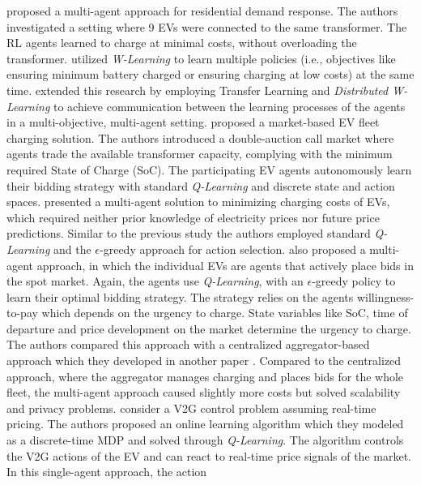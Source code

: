 \documentclass[12pt, article]{article}
\begin{document}
\textcite{dusparic13_multi} proposed a multi-agent approach for residential demand
response. The authors investigated a setting where 9  EVs were connected to the
same transformer. The RL agents learned to charge at minimal costs, without
overloading the transformer. \textcite{dusparic13_multi} utilized \emph{W-Learning} to
learn multiple policies (i.e., objectives like ensuring minimum battery charged
or ensuring charging at low costs) at the same time.
\textcite{taylor14_accel_learn_trans_learn} extended this research by employing
Transfer Learning and \emph{Distributed W-Learning} to achieve communication between
the learning processes of the agents in a multi-objective, multi-agent setting.
\textcite{dauer13_market_based_ev_charg_coord} proposed a market-based EV fleet
charging solution. The authors introduced a double-auction call market where
agents trade the available transformer capacity, complying with the minimum
required State of Charge (SoC). The participating EV agents autonomously learn
their bidding strategy with standard \emph{Q-Learning} and discrete state and action
spaces. \textcite{giorgio13_elect_vehic} presented a multi-agent solution to
minimizing charging costs of EVs, which required neither prior knowledge of
electricity prices nor future price predictions. Similar to the previous study
the authors employed standard \emph{Q-Learning} and the \(\epsilon\)-greedy approach for
action selection. \textcite{vaya14_optim} also proposed a multi-agent approach, in
which the individual EVs are agents that actively place bids in the spot market.
Again, the agents use \emph{Q-Learning}, with an \(\epsilon\)-greedy policy to learn
their optimal bidding strategy. The strategy relies on the agents
willingness-to-pay which depends on the urgency to charge. State variables like
SoC, time of departure and price development on the market determine the urgency
to charge. The authors compared this approach with a centralized
aggregator-based approach which they developed in another paper
\parencite{vaya15_optim_biddin_strat_plug_in}. Compared to the centralized
approach, where the aggregator manages charging and places bids for the whole
fleet, the multi-agent approach caused slightly more costs but solved
scalability and privacy problems. \textcite{shi11_real} consider a V2G control
problem assuming real-time pricing. The authors proposed an online learning
algorithm which they modeled as a discrete-time MDP and solved through
\emph{Q-Learning}. The algorithm controls the V2G actions of the EV and can react to
real-time price signals of the market. In this single-agent approach, the action
\end{document}
